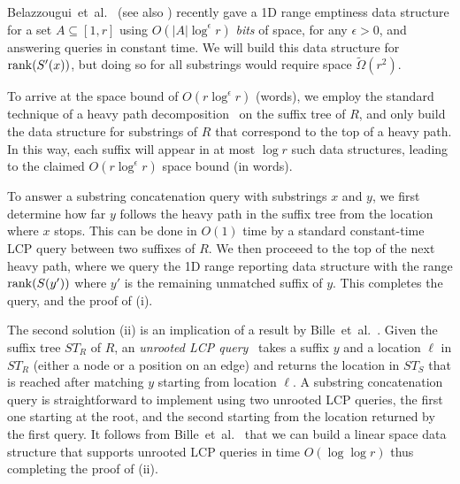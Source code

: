 Belazzougui~et~al.~\cite{belazzougui2010fast} (see also \cite{goswami2015}) recently gave a 1D range emptiness data structure for a set $A \subseteq [1,r]$ using $O(|A|\log^\epsilon r)$ \emph{bits} of space, for any $\epsilon > 0$, and answering queries in constant time. We will build this data structure for $\mathrm{rank}(S'(x))$, but doing so for all substrings would require space $\tilde \Omega(r^2)$. 

To arrive at the space bound of $O(r\log^\epsilon r)$ (words), we employ the standard technique of a heavy path decomposition~\cite{harel1984fast} on the suffix tree of $R$, and only build the data structure for substrings of $R$ that correspond to the top of a heavy path. In this way, each suffix will appear in at most $\log r$ such data structures, leading to the claimed $O(r\log^\epsilon r)$ space bound (in words).

To answer a substring concatenation query with substrings $x$ and $y$, we first determine how far $y$ follows the heavy path in the suffix tree from the location where $x$ stops. This can be done in $O(1)$ time by a standard constant-time LCP query between two suffixes of $R$. We then proceeed to the top of the next heavy path, where we query the 1D range reporting data structure with the range $\mathrm{rank}(S(y'))$ where $y'$ is the remaining unmatched suffix of $y$. This completes the query, and the proof of (i).

The second solution (ii) is an implication of a result by Bille~et~al.~\cite{bille2014string}. Given the suffix tree $ST_R$ of $R$, an \emph{unrooted LCP query}~\cite{cole2004dictionary} takes a suffix $y$ and a location $\ell$ in $ST_R$ (either a node or a position on an edge) and returns the location in $ST_S$ that is reached after matching $y$ starting from location $\ell$. A substring concatenation query is straightforward to implement using two unrooted LCP queries, the first one starting at the root, and the second starting from the location returned by the first query. It follows from Bille~et~al.~\cite{bille2014string} that we can build a linear space data structure that supports unrooted LCP queries in time $O(\log \log r)$ thus completing the proof of (ii).